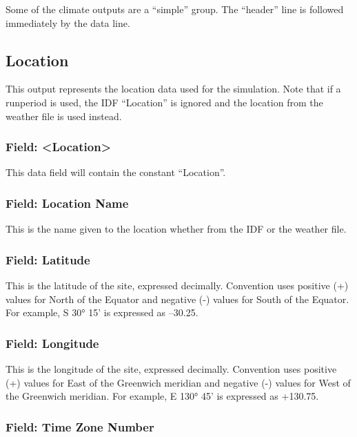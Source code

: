 Some of the climate outputs are a ``simple'' group. The ``header'' line is followed immediately by the data line.

\subsection{Location}\label{location}

This output represents the location data used for the simulation. Note that if a runperiod is used, the IDF ``Location'' is ignored and the location from the weather file is used instead.

\subsubsection{Field: \textless{}Location\textgreater{}}\label{field-location}

This data field will contain the constant ``Location''.

\subsubsection{Field: Location Name}\label{field-location-name}

This is the name given to the location whether from the IDF or the weather file.

\subsubsection{Field: Latitude}\label{field-latitude}

This is the latitude of the site, expressed decimally. Convention uses positive (+) values for North of the Equator and negative (-) values for South of the Equator. For example, S 30° 15' is expressed as --30.25.

\subsubsection{Field: Longitude}\label{field-longitude}

This is the longitude of the site, expressed decimally. Convention uses positive (+) values for East of the Greenwich meridian and negative (-) values for West of the Greenwich meridian. For example, E 130° 45' is expressed as +130.75.

\subsubsection{Field: Time Zone Number}\label{field-time-zone-number}

